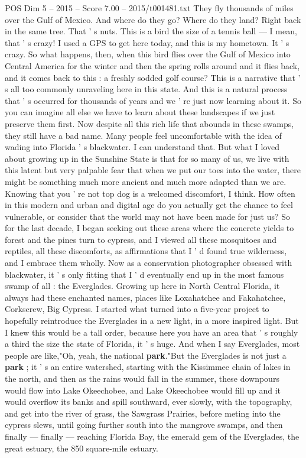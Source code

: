 \begin{textsample}{POS Dim 5 – 2015 – Score 7.00 – 2015/t001481.txt}
They fly thousands of miles over the Gulf of Mexico.
And where do they go?
Where do they land?
Right back in the same tree.
That ' s nuts.
This is a bird the size of a tennis ball — I mean, that ' s crazy!
I used a GPS to get here today, and this is my hometown.
It ' s crazy.
So what happens, then, when this bird flies over the Gulf of Mexico into Central America for the winter and then the spring rolls around and it flies back, and it comes back to this : a freshly sodded golf course?
This is a narrative that ' s all too commonly unraveling here in this state.
And this is a natural process that ' s occurred for thousands of years and we ' re just now learning about it.
So you can imagine all else we have to learn about these landscapes if we just preserve them first.
Now despite all this rich life that abounds in these swamps, they still have a bad name.
Many people feel uncomfortable with the idea of wading into Florida ' s blackwater.
I can understand that.
But what I loved about growing up in the Sunshine State is that for so many of us, we live with this latent but very palpable fear that when we put our toes into the water, there might be something much more ancient and much more adapted than we are.
Knowing that you ' re not top dog is a welcomed discomfort, I think.
How often in this modern and urban and digital age do you actually get the chance to feel vulnerable, or consider that the world may not have been made for just us?
So for the last decade, I began seeking out these areas where the concrete yields to forest and the pines turn to cypress, and I viewed all these mosquitoes and reptiles, all these discomforts, as affirmations that I ' d found true wilderness, and I embrace them wholly.
Now as a conservation photographer obsessed with blackwater, it ' s only fitting that I ' d eventually end up in the most famous swamp of all : the Everglades.
Growing up here in North Central Florida, it always had these enchanted names, places like Loxahatchee and Fakahatchee, Corkscrew, Big Cypress.
I started what turned into a five-year project to hopefully reintroduce the Everglades in a new light, in a more inspired light.
But I knew this would be a tall order, because here you have an area that ' s roughly a third the size the state of Florida, it ' s huge.
And when I say Everglades, most people are like,"Oh, yeah, the national \textbf{park}."But the Everglades is not just a \textbf{park} ; it ' s an entire watershed, starting with the Kissimmee chain of lakes in the north, and then as the rains would fall in the summer, these downpours would flow into Lake Okeechobee, and Lake Okeechobee would fill up and it would overflow its banks and spill southward, ever slowly, with the topography, and get into the river of grass, the Sawgrass Prairies, before meting into the cypress slews, until going further south into the mangrove swamps, and then finally — finally — reaching Florida Bay, the emerald gem of the Everglades, the great estuary, the 850 square-mile estuary.

\end{textsample}
